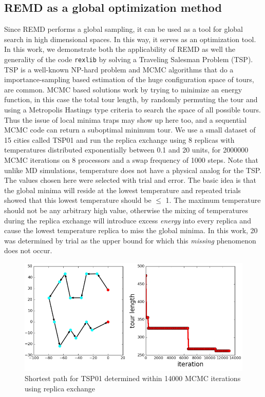 \documentclass[12pt,letterpaper]{article}
\begin{document}
\subsection*{REMD as a global optimization method}
\noindent Since REMD performs a global sampling, it can be used as a tool for global search in high dimensional spaces. In this way, it serves as an optimization tool. In this work, we demonstrate both the applicability of REMD as well the generality of the code \texttt{rexlib} by solving a Traveling Salesman Problem (TSP). TSP is a well-known NP-hard problem and MCMC algorithms that do a importance-sampling based estimation of the huge configuration space of tours, are common. MCMC based solutions work by trying to minimize an energy function, in this case the total tour length, by randomly permuting the tour and using a Metropolis Hastings\cite{hastings70} type criteria to search the space of all possible tours. Thus the issue of local minima traps may show up here too, and a sequential MCMC code can return a suboptimal minimum tour. We use a small dataset of 15 cities called TSP01 \cite{tsp} and run the replica exchange using 8 replicas with temperatures distributed exponentially between 0.1 and 20 units, for 2000000 MCMC iterations on 8 processors and a swap frequency of 1000 steps. Note that unlike MD simulations, temperature does not have a physical analog for the TSP. The values chosen here were selected with trial and error. The basic idea is that the global minima will reside at the lowest temperature and repeated trials showed that this lowest temperature should be $ \leq $ 1. The maximum temperature should not be any arbitrary high value, otherwise the mixing of temperatures during the replica exchange will introduce excess \textit{energy} into every replica and cause the lowest temperature replica to miss the global minima. In this work, 20 was determined by trial as the upper bound for which this \textit{missing} phenomenon does not occur.
%
\begin{figure}[h!]
\centering
\includegraphics[scale=0.5]{artwork/tsp_parallel.png}
\caption{Shortest path for TSP01\cite{tsp} determined within 14000 MCMC iterations using replica exchange}
\end{figure}
\end{document}
